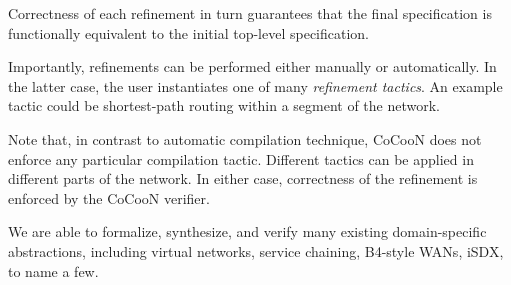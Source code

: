 \documentclass[letterpaper,10pt,twocolumn]{article}
\begin{document}
Correctness of each refinement in turn guarantees that the final 
specification is functionally equivalent to the initial top-level 
specification.  

Importantly, refinements can be performed either manually or 
automatically.  In the latter case, the user instantiates one of 
many \emph{refinement tactics}.  An example tactic could be
shortest-path routing within a segment of the network.  

Note that, in contrast to automatic compilation technique, CoCooN 
does not enforce any particular compilation tactic.  Different 
tactics can be applied in different parts of the network.  In 
either case, correctness of the refinement is enforced by the 
CoCooN verifier.  

We are able to formalize, synthesize, and verify many existing 
domain-specific abstractions, including virtual networks, service 
chaining, B4-style WANs, iSDX, to name a few. 

%
%
%
\end{document}
